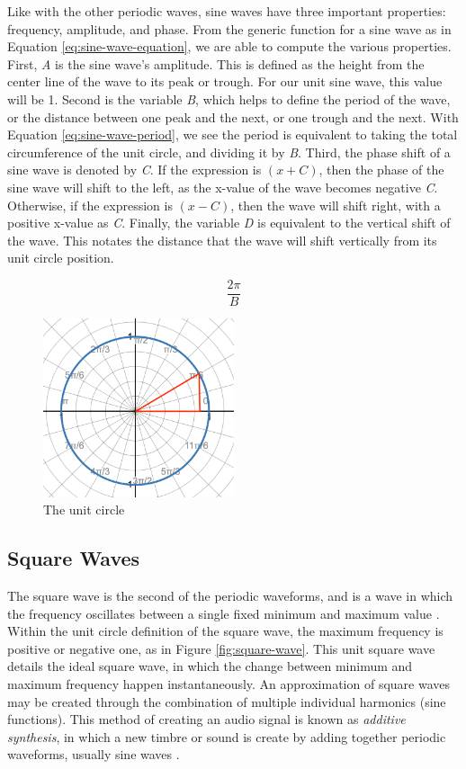Like with the other periodic waves, sine waves have three important properties: frequency, amplitude, and phase. From the generic function for a sine wave as in Equation \ref{eq:sine-wave-equation}, we are able to compute the various properties. First, \textit{A} is the sine wave's amplitude. This is defined as the height from the center line of the wave to its peak or trough. For our unit sine wave, this value will be 1. Second is the variable \textit{B}, which helps to define the period of the wave, or the distance between one peak and the next, or one trough and the next. With Equation \ref{eq:sine-wave-period}, we see the period is equivalent to taking the total circumference of the unit circle, and dividing it by \textit{B}. Third, the phase shift of a sine wave is denoted by \textit{C}. If the expression is $(x + C)$, then the phase of the sine wave will shift to the left, as the x-value of the wave becomes negative \textit{C}. Otherwise, if the expression is $(x - C)$, then the wave will shift right, with a positive x-value as \textit{C}. Finally, the variable \textit{D} is equivalent to the vertical shift of the wave. This notates the distance that the wave will shift vertically from its unit circle position.

\begin{equation}
	\frac{2\pi}{B}
	\label{eq:sine-wave-period}
\end{equation}

\begin{figure}
	\centering
	\includegraphics[width=0.5\textwidth]{figures/unit-circle.png}
	\caption{The unit circle}
	\label{fig:unit-circle}
\end{figure}

\subsection{Square Waves}
The square wave is the second of the periodic waveforms, and is a wave in which the frequency oscillates between a single fixed minimum and maximum value \cite{Tarr_2019}. Within the unit circle definition of the square wave, the maximum frequency is positive or negative one, as in Figure \ref{fig:square-wave}. This unit square wave details the ideal square wave, in which the change between minimum and maximum frequency happen instantaneously. An approximation of square waves may be created through the combination of multiple individual harmonics (sine functions). This method of creating an audio signal is known as \textit{additive synthesis}, in which a new timbre or sound is create by adding together periodic waveforms, usually sine waves \cite{Tarr_2019}. 

